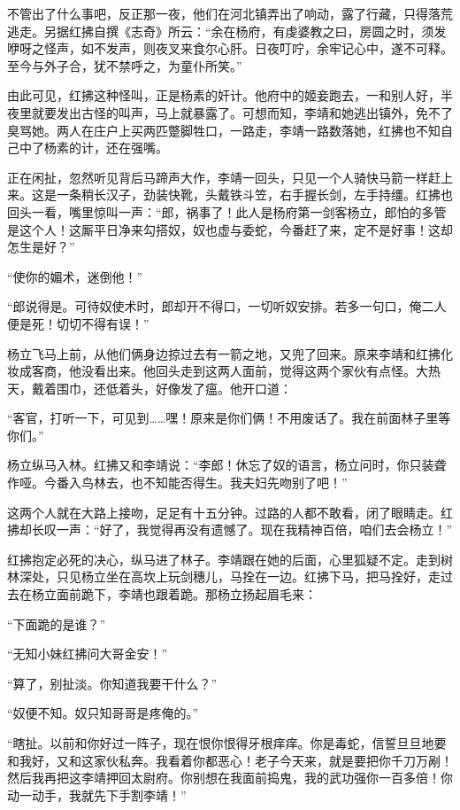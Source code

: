 不管出了什么事吧，反正那一夜，他们在河北镇弄出了响动，露了行藏，只得落荒逃走。另据红拂自撰《志奇》所云：“余在杨府，有虔婆教之曰，房圆之时，须发咿呀之怪声，如不发声，则夜叉来食尔心肝。日夜叮咛，余牢记心中，遂不可释。至今与外子合，犹不禁呼之，为童仆所笑。”

由此可见，红拂这种怪叫，正是杨素的奸计。他府中的姬妾跑去，一和别人好，半夜里就要发出古怪的叫声，马上就暴露了。可想而知，李靖和她逃出镇外，免不了臭骂她。两人在庄户上买两匹蹩脚牲口，一路走，李靖一路数落她，红拂也不知自己中了杨素的计，还在强嘴。

正在闲扯，忽然听见背后马蹄声大作，李靖一回头，只见一个人骑快马箭一样赶上来。这是一条稍长汉子，劲装快靴，头戴铁斗笠，右手握长剑，左手持缰。红拂也回头一看，嘴里惊叫一声：“郎，祸事了！此人是杨府第一剑客杨立，郎怕的多管是这个人！这厮平日净来勾搭奴，奴也虚与委蛇，今番赶了来，定不是好事！这却怎生是好？”

“使你的媚术，迷倒他！”

“郎说得是。可待奴使术时，郎却开不得口，一切听奴安排。若多一句口，俺二人便是死！切切不得有误！”

杨立飞马上前，从他们俩身边掠过去有一箭之地，又兜了回来。原来李靖和红拂化妆成客商，他没看出来。他回头走到这两人面前，觉得这两个家伙有点怪。大热天，戴着围巾，还低着头，好像发了瘟。他开口道：

“客官，打听一下，可见到……嘿！原来是你们俩！不用废话了。我在前面林子里等你们。”

杨立纵马入林。红拂又和李靖说：“李郎！休忘了奴的语言，杨立问时，你只装聋作哑。今番入鸟林去，也不知能否得生。我夫妇先吻别了吧！”

这两个人就在大路上接吻，足足有十五分钟。过路的人都不敢看，闭了眼睛走。红拂却长叹一声：“好了，我觉得再没有遗憾了。现在我精神百倍，咱们去会杨立！”

红拂抱定必死的决心，纵马进了林子。李靖跟在她的后面，心里狐疑不定。走到树林深处，只见杨立坐在高坎上玩剑穗儿，马拴在一边。红拂下马，把马拴好，走过去在杨立面前跪下，李靖也跟着跪。那杨立扬起眉毛来：

“下面跪的是谁？”

“无知小妹红拂问大哥金安！”

“算了，别扯淡。你知道我要干什么？”

“奴便不知。奴只知哥哥是疼俺的。”

“瞎扯。以前和你好过一阵子，现在恨你恨得牙根痒痒。你是毒蛇，信誓旦旦地要和我好，又和这家伙私奔。我看着你都恶心！老子今天来，就是要把你千刀万剐！然后我再把这李靖押回太尉府。你别想在我面前捣鬼，我的武功强你一百多倍！你动一动手，我就先下手割李靖！”

